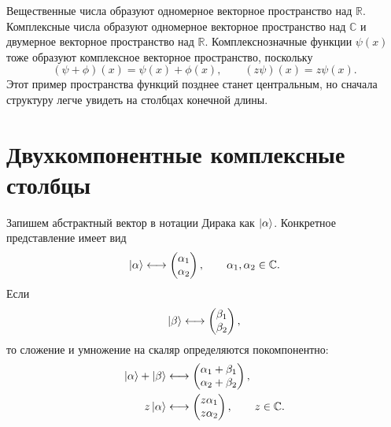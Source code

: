 Вещественные числа образуют одномерное векторное пространство над \(\mathbb R\). Комплексные числа образуют одномерное векторное пространство над \(\mathbb C\) и двумерное векторное пространство над \(\mathbb R\). Комплекснозначные функции \(\psi(x)\) тоже образуют комплексное векторное пространство, поскольку
\begin{equation}
  (\psi+\phi)(x)=\psi(x)+\phi(x),
  \qquad
  (z\psi)(x)=z\psi(x).
\end{equation}
Этот пример пространства функций позднее станет центральным, но сначала структуру легче увидеть на столбцах конечной длины.

\begin{classroomqa}
\end{classroomqa}

\section{Двухкомпонентные комплексные столбцы}

Запишем абстрактный вектор в нотации Дирака как \(\left\lvert\alpha\right\rangle\). Конкретное представление имеет вид
\begin{equation}
  \left\lvert\alpha\right\rangle
  \longleftrightarrow
  \begin{pmatrix}
    \alpha_1\\
    \alpha_2
  \end{pmatrix},
  \qquad
  \alpha_1,\alpha_2\in\mathbb C.
\end{equation}
Если
\begin{equation}
  \left\lvert\beta\right\rangle
  \longleftrightarrow
  \begin{pmatrix}
    \beta_1\\
    \beta_2
  \end{pmatrix},
\end{equation}
то сложение и умножение на скаляр определяются покомпонентно:
\begin{align}
  \left\lvert\alpha\right\rangle+\left\lvert\beta\right\rangle
  &\longleftrightarrow
  \begin{pmatrix}
    \alpha_1+\beta_1\\
    \alpha_2+\beta_2
  \end{pmatrix},\\
  z\left\lvert\alpha\right\rangle
  &\longleftrightarrow
  \begin{pmatrix}
    z\alpha_1\\
    z\alpha_2
  \end{pmatrix},
  \qquad z\in\mathbb C.
\end{align}

